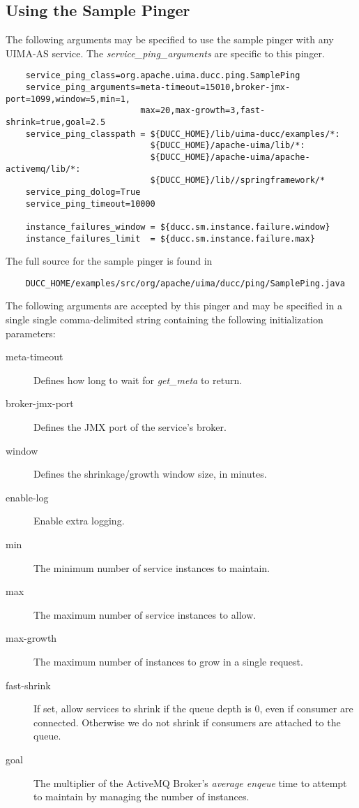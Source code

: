     \subsection{Using the Sample Pinger}
    The following arguments may be specified to use the sample pinger with any UIMA-AS service.  The
    {\em service\_ping\_arguments} are specific to this pinger.
\begin{verbatim}
    service_ping_class=org.apache.uima.ducc.ping.SamplePing
    service_ping_arguments=meta-timeout=15010,broker-jmx-port=1099,window=5,min=1,
                           max=20,max-growth=3,fast-shrink=true,goal=2.5
    service_ping_classpath = ${DUCC_HOME}/lib/uima-ducc/examples/*:
                             ${DUCC_HOME}/apache-uima/lib/*:
                             ${DUCC_HOME}/apache-uima/apache-activemq/lib/*:
                             ${DUCC_HOME}/lib//springframework/*
    service_ping_dolog=True
    service_ping_timeout=10000

    instance_failures_window = ${ducc.sm.instance.failure.window}
    instance_failures_limit  = ${ducc.sm.instance.failure.max}    
\end{verbatim}

    The full source for the sample pinger is found in
\begin{verbatim}
    DUCC_HOME/examples/src/org/apache/uima/ducc/ping/SamplePing.java
\end{verbatim}
    
    The following arguments are accepted by this pinger and may be specified in a single single
    comma-delimited string containing the following initialization parameters:
    \begin{description}
      \item[meta-timeout] Defines how long to wait for {\em get\_meta} to return.
      \item[broker-jmx-port] Defines the JMX port of the service's broker.
      \item[window] Defines the shrinkage/growth window size, in minutes.
      \item[enable-log] Enable extra logging.
      \item[min] The minimum number of service instances to maintain.
      \item[max] The maximum number of service instances to allow.
      \item[max-growth] The maximum number of instances to grow in a
        single request.
      \item[fast-shrink] If set, allow services to shrink if the
        queue depth is 0, even if consumer are connected.  Otherwise
        we do not shrink if consumers are attached to the queue.
      \item[goal] The multiplier of the ActiveMQ Broker's {\em average enqeue}
        time to attempt to maintain by managing the number of instances.
    \end{description}

